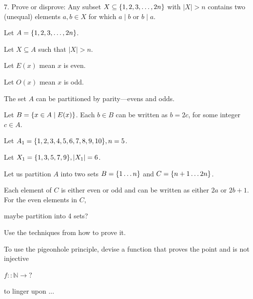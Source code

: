 \documentclass{article}
\begin{document}
\begin{exercise}{}{}
	{7. Prove or disprove: Any subset $X \subseteq\{1,2,3, \ldots,
				2 n\}$ with $|X|>n$ contains two (unequal) elements $a, b \in X$ for which
		$a \mid b$ or $b \mid a$.}
	\begin{alist}
		\item Let $A=\{1,2,3, \ldots, 2 n\}$.
		\item Let $X\subseteq A$ such that $|X|>n$.
		\item Let $E(x)$ mean $x$ is even.
		\item Let $O(x)$ mean $x$ is odd.
		\item The set $A$ can be partitioned by parity---evens and odds.
		\item Let $B=\{x\in A \mid E(x)\}$. Each $b\in B$ can be written as $b=2c$,
		for some integer $c\in A$.

		\item Let $A_1=\{1,2,3,4, 5, 6, 7, 8, 9, 10 \}, n=5$.
		\item Let $X_1=\{1, 3, 5, 7, 9\}, |X_1|=6$.

		\item  Let us partition $A$ into two sets $B=\{1\dots n\}$ and
		$C=\{n+1\dots 2n\}$.
		\item Each element of $C$ is either even or odd and can be written as either
		$2a$ or $2b+1$. For the even elements in $C$,
		\item maybe partition into 4 sets?
		\item Use the techniques from how to prove it.
		\item To use the pigeonhole principle, devise a function that proves the point
		and is not injective
		\item $f :: \mathbb{N} \rightarrow ? $
		\item to linger upon ...
	\end{alist}
\end{exercise}{}{}
\end{document}
